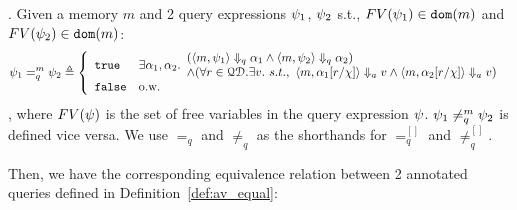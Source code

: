 \documentclass[a4paper,11pt]{article}
\begin{document}
\begin{defn}.
%
\label{def:query_equal}
 Given a memory $m$ and 2 query expressions $\psi_1$, $\psi_2$ s.t., $FV(\psi_1) \in \mathtt{dom}(m)$ and $FV(\psi_2) \in \mathtt{dom}(m)$:
$$
\qexpr_1 =_{q}^{m} \qexpr_2 \triangleq
\left\{
		\begin{array}{ll} 
			\etrue			
			& 
		\exists \qval_1, \qval_2.
		\begin{array}{l} 
			(\config{m,  \qexpr_1} \qarrow \qval_1 \land \config{m,  \qexpr_2 } \qarrow \qval_2) 
			\\
			\land (\forall r \in \qdom. \exists v. ~ s.t., ~ 
						\config{m, \qval_1[r/\chi]} \aarrow v \land \config{m,  \qval_2[r/\chi] } \aarrow v)	
		\end{array}\\
			\efalse  				
			& \text{o.w.} 
		\end{array}
		\right.
$$
%
, where $FV(\psi)$ is the set of free variables in the query expression $\psi$.
$\psi_1 \neq_{q}^{m} \psi_2$  is defined vice versa.
%
We use $=_{q}$  and $\neq_{q}$ as the shorthands for $=_{q}^{[]}$ and $\neq^{[]}_{q}$.
\end{defn}
%
Then, we have the corresponding equivalence relation between 2 annotated queries defined in Definition~\ref{def:av_equal}:
%
%
%
%
\end{document}
